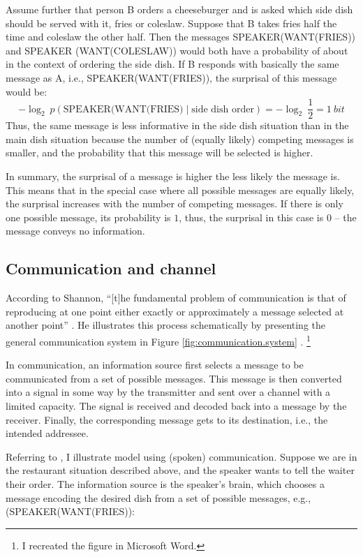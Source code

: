 \noindent
Assume further that person B orders a cheeseburger and is asked which side dish should be served with it, fries or coleslaw.
Suppose that B takes fries half the time and coleslaw the other half.
Then the messages SPEAKER(WANT(FRIES)) and SPEAKER (WANT(COLESLAW)) would both have a probability of about  in the context of ordering the side dish.
If B responds with basically the same message as A, i.e., SPEAKER(WANT(FRIES)), the surprisal of this message would be:
\begin{equation}
\mathbin{-}\log_{2}\ p(\text{SPEAKER(WANT(FRIES)}\mathbin{|}\text{side dish order}) = \mathbin{-}\log_{2}\ \frac{1}{2} = 1\ bit
\end{equation}
\noindent
Thus, the same message is less informative in the side dish situation than in the main dish situation because the number of (equally likely) competing messages is smaller, and the probability that this message will be selected is higher.

In summary, the surprisal of a message is higher the less likely the message is.
This means that in the special case where all possible messages are equally likely, the surprisal increases with the number of competing messages.
If there is only one possible message, its probability is $1$, thus, the surprisal in this case is 0 -- the message conveys no information.

\subsection{Communication and channel}
According to Shannon, ``[t]he fundamental problem of communication is that of reproducing at one point either exactly or approximately a message selected at another point'' \citep[379]{shannon1948}.
He illustrates this process schematically by presenting the general communication system in Figure \ref{fig:communication.system} \citep[381]{shannon1948}.%
\footnote{I recreated the figure in Microsoft Word.}

In communication, an information source first selects a message to be communicated from a set of possible messages.
This message is then converted into a signal in some way by the transmitter and sent over a channel with a limited capacity.  
The signal is received and decoded back into a message by the receiver.
Finally, the corresponding message gets to its destination, i.e., the intended addressee.

Referring to \citet[7]{weaver1949}, I illustrate  model using (spoken) communication.
Suppose we are in the restaurant situation described above, and the speaker wants to tell the waiter their order.
The information source is the speaker's brain, which chooses a message encoding the desired dish from a set of possible messages, e.g., (SPEAKER(WANT(FRIES)):

